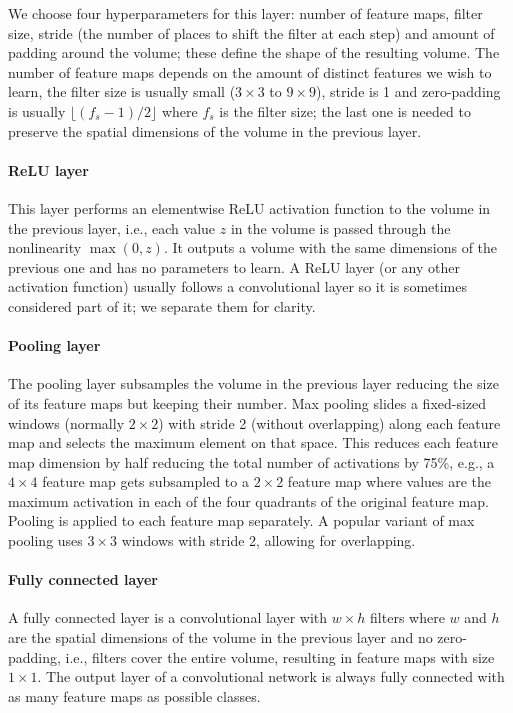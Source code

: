 We choose four hyperparameters for this layer: number of feature maps, filter size, stride (the number of places to shift the filter at each step) and amount of padding around the volume; these define the shape of the resulting volume. The number of feature maps depends on the amount of distinct features we wish to learn, the filter size is usually small ($3\times3$ to $9\times9$), stride is 1 and zero-padding is usually $\lfloor (f_s-1)/2\rfloor$ where $f_s$ is the filter size; the last one is needed to preserve the spatial dimensions of the volume in the previous layer.

\paragraph{ReLU layer} This layer performs an elementwise ReLU activation function to the volume in the previous layer, i.e., each value $z$ in the volume is passed through the nonlinearity $\max(0,z)$. It outputs a volume with the same dimensions of the previous one and has no parameters to learn. A ReLU layer (or any other activation function) usually follows a convolutional layer so it is sometimes considered part of it; we separate them for clarity. 

\paragraph{Pooling layer} The pooling layer subsamples the volume in the previous layer reducing the size of its feature maps but keeping their number. Max pooling slides a fixed-sized windows (normally $2\times2$) with stride 2 (without overlapping) along each feature map and selects the maximum element on that space. This reduces each feature map dimension by half reducing the total number of activations by 75\%, e.g., a $4\times4$ feature map gets subsampled to a $2\times 2$ feature map where values are the maximum activation in each of the four quadrants of the original feature map. Pooling is applied to each feature map separately. A popular variant of max pooling uses $3\times 3$ windows with stride 2, allowing for overlapping.

\paragraph{Fully connected layer} A fully connected layer is a convolutional layer with $w\times h$ filters where $w$ and $h$ are the spatial dimensions of the volume in the previous layer and no zero-padding, i.e., filters cover the entire volume, resulting in feature maps with size $1 \times 1$. The output layer of a convolutional network is always fully connected with as many feature maps as possible classes.%

